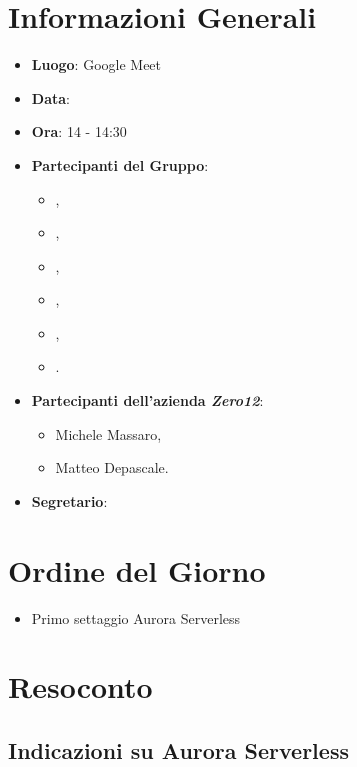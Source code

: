\section{Informazioni Generali}

\begin{itemize}
\item{\textbf{Luogo}}: Google Meet
\item{\textbf{Data}}: \D
\item{\textbf{Ora}}: 14 - 14:30
\item{\textbf{Partecipanti del Gruppo}}: 
	\begin{itemize}
	\item{\EP{},} 
	\item{\FP{},}
	\item{\GC{},}
	\item{\LW{},}
	\item{\MB{},}
	\item{\PV{}.}
	\end{itemize} 
\item{\textbf{Partecipanti dell'azienda \textit{Zero12}}}: 
	\begin{itemize}
	\item{Michele Massaro,} 
	\item{Matteo Depascale.}
	\end{itemize} 
\item{\textbf{Segretario}}: \PV{}	
\end{itemize}

\section{Ordine del Giorno}
\begin{itemize}
\item{Primo settaggio Aurora Serverless}
\end{itemize}

\section{Resoconto}
 
\subsection{Indicazioni su Aurora Serverless} 

